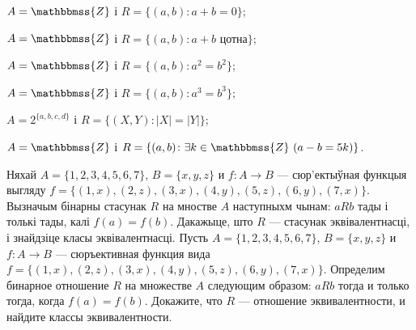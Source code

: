 \begin{problemList}
{\begin{belarusianEnumerate}
\item $A = \mathbbmss{Z}$ і $R = \{(a, b) \colon a + b = 0\}$;
\item $A = \mathbbmss{Z}$ і $R = \{(a, b) \colon a + b \,\,\text{цотна}\}$;
\item $A = \mathbbmss{Z}$ і $R = \{(a, b) \colon a^2 = b^2\}$;
\item $A = \mathbbmss{Z}$ і $R = \{(a, b) \colon a^3 = b^3\}$;
\item $A = 2^{\{a, b, c, d\}}$ і $R = \{(X, Y) \colon |X| = |Y|\}$;
\item $A = \mathbbmss{Z}$ і $R = \{(a, b) \colon \exists k \in \mathbbmss{Z} \,\, (a - b = 5k)\}$.
	
\end{belarusianEnumerate}
}

\bigskip

\problemItemSimple
{Няхай $A = \{1, 2, 3, 4, 5, 6, 7\}$, $B = \{x, y, z\}$ и $f \colon A \to B$ --- сюр'ектыўная функцыя выгляду $f = \{(1, x), (2, z), (3, x), (4, y), (5, z), (6, y), (7, x)\}$.
Вызначым бінарны стасунак $R$ на мностве $A$ наступныхм чынам: $aRb$ тады і толькі тады, калі $f(a) = f(b)$. Дакажыце, што $R$ ---  стасунак эквівалентнасці, і знайдзіце класы эквівалентнасці.}
{Пусть $A = \{1, 2, 3, 4, 5, 6, 7\}$, $B = \{x, y, z\}$ и $f \colon A \to B$ ---
сюръективная функция вида $f = \{(1, x), (2, z), (3, x), (4, y), (5, z), (6, y), (7, x)\}$.
Определим бинарное отношение $R$ на множестве $A$ следующим образом: $aRb$ тогда и только тогда, когда $f(a) = f(b)$. Докажите, что $R$ --- отношение эквивалентности, и найдите классы эквивалентности.}
	
\end{problemList}

